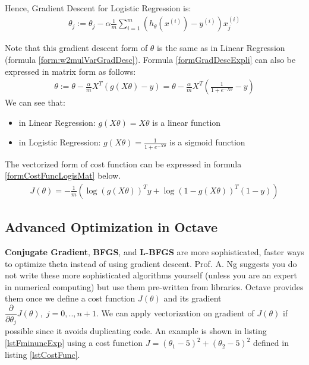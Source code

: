 Hence, Gradient Descent for Logistic Regression is:
\begin{align}\label{formGradDescExpli}
\theta_j := \theta_j - \alpha \frac{1}{m} \sum_{i=1}^m (h_\theta(x^{(i)}) - y^{(i)}) x_j^{(i)}
\end{align}

Note that this gradient descent form of $\theta$ is the same as in Linear Regression (formula \eqref{form:w2mulVarGradDesc}). Formula \eqref{formGradDescExpli} can also be expressed in matrix form as follows:
\begin{align}\label{formGradDescMat}
\theta := \theta - \frac{\alpha}{m} X^T (g(X\theta) - y) = \theta - \frac{\alpha}{m} X^T (\frac{1}{1 + e^{-X\theta}} - y)
\end{align}
We can see that: 
\begin{itemize}
	\item in Linear Regression: $g(X\theta) = X\theta$ is a linear function
	\item in Logistic Regression: $g(X\theta) = \frac{1}{1 + e^{-X\theta}}$ is a sigmoid function
\end{itemize}

The vectorized form of cost function can be expressed in formula \eqref{formCostFuncLogisMat} below.
\begin{align} \label{formCostFuncLogisMat}
J\left(\theta\right)  =  -\frac{1}{m}\left(\log\left(g\left(X\theta\right)\right)^{T}y+\log\left(1-g\left(X\theta\right)\right)^{T}\left(1-y\right)\right)
\end{align}


\subsection{Advanced Optimization in Octave}
\textbf{Conjugate Gradient}, \textbf{BFGS}, and \textbf{L-BFGS} are more sophisticated, faster ways to optimize theta instead of using gradient descent. Prof. A. Ng suggests you do not write these more sophisticated algorithms yourself (unless you are an expert in numerical computing) but use them pre-written from libraries. Octave provides them once we define a cost function $J(\theta)$ and its gradient $\dfrac{\partial}{\partial \theta_j}J(\theta), \; j=0,..,n+1$. We can apply vectorization on gradient of $J(\theta)$ if possible since it avoids duplicating code. An example is shown in listing \ref{lstFminuncExp} using a cost function $J = (\theta_1 - 5)^2 + (\theta_2 - 5)^2$ defined in listing \ref{lstCostFunc}.




